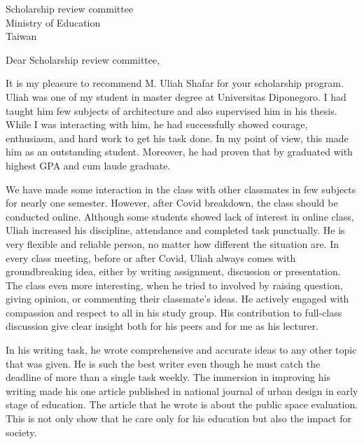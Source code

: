 \documentclass[12pt, a4paper]{simref} %
\begin{document}

\begin{letter}{
	Scholarship review committee\\
	Ministry of Education\\
	Taiwan\\
}


\opening{Dear Scholarship review committee,}

It is my pleasure to recommend M. Uliah Shafar for your scholarship program. Uliah was one of my student in master degree at Universitas Diponegoro. I had taught him few subjects of architecture and also supervised him in his thesis. While I was interacting with him, he had successfully showed courage, enthusiasm, and hard work to get his task done. In my point of view, this made him as an outstanding student. Moreover, he had proven that by graduated with highest GPA and cum laude graduate.

We have made some interaction in the class with other classmates in few subjects for nearly one semester. However, after Covid breakdown, the class should be conducted online. Although some students showed lack of interest in online class, Uliah increased his discipline, attendance and completed task punctually. He is very flexible and reliable person, no matter how different the situation are. In every class meeting, before or after Covid, Uliah always comes with groundbreaking idea, either by writing assignment, discussion or presentation. The class even more interesting, when he tried to involved by raising question, giving opinion, or commenting their classmate's ideas. He actively engaged with compassion and respect to all in his study group. His contribution to full-class discussion give clear insight both for his peers and for me as his lecturer.

In his writing task, he wrote comprehensive and accurate ideas to any other topic that was given.
He is such the best writer
even though he must catch the deadline of more than a single task weekly. The immersion in improving his writing made his one article published in national journal of urban design in early stage of education. The article that he wrote is about the public space evaluation.
This is not only show that he care only for his education but also the impact for society.


\end{letter}
\end{document}
